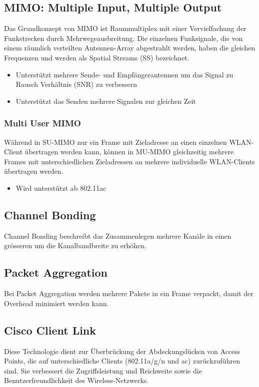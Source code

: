 \subsection{MIMO: Multiple Input, Multiple Output}
Das Grundkonzept von MIMO ist Raummultiplex mit einer Vervielfachung der Funkstrecken durch Mehrwegeausbreitung. Die einzelnen Funksignale, die von einem räumlich verteilten Antennen-Array abgestrahlt werden, haben die gleichen Frequenzen und werden als Spatial Streams (SS) bezeichnet.
\begin{itemize}
	\item Unterstützt mehrere Sende- und Empfängerantennen um das Signal zu Rausch Verhältnis (SNR) zu verbessern
	\item Unterstützt das Senden mehrere Signalen zur gleichen Zeit
\end{itemize}

\subsubsection{Multi User MIMO}
Während in SU-MIMO nur ein Frame mit Zieladresse an einen einzelnen WLAN-Client übertragen werden kann, können in MU-MIMO gleichzeitig mehrere Frames mit unterschiedlichen Zieladressen an mehrere individuelle WLAN-Clients übertragen werden. 
\begin{itemize}
	\item Wird unterstützt ab 802.11ac
\end{itemize}

\subsection{Channel Bonding}
Channel Bonding beschreibt das Zusammenlegen mehrere Kanäle in einen grösseren um die Kanalbandbreite zu erhöhen.

\subsection{Packet Aggregation}
Bei Packet Aggregation werden mehrere Pakete in ein Frame verpackt, damit der Overhead minimiert werden kann.

\subsection{Cisco Client Link}
Diese Technologie dient zur Überbrückung der Abdeckungslücken von Access Points, die auf unterschiedliche Clients (802.11a/g/n und ac) zurückzuführen sind. Sie verbessert die Zugriffsleistung und Reichweite sowie die Benutzerfreundlichkeit des Wireless-Netzwerks.
	
